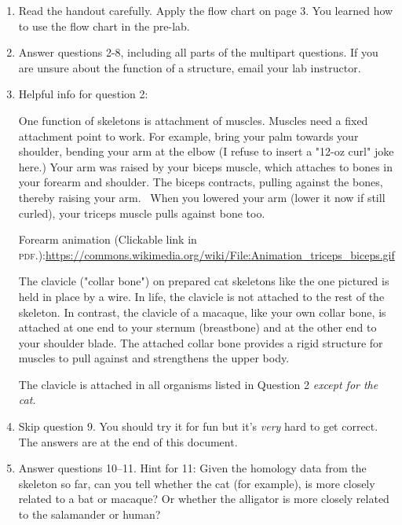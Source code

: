 \documentclass[12pt]{exam}
\begin{document}
\begin{enumerate}

\item Read the handout carefully. Apply the flow chart on page 3. You learned how to use the flow chart in the pre-lab.

\item Answer questions 2-8, including all parts of the multipart questions. If you are unsure about the function of a structure, email your lab instructor.

\item Helpful info for question 2:

One function of skeletons is attachment of muscles. Muscles need a fixed attachment point to work. For example, bring your palm towards your shoulder, bending your arm at the elbow (I refuse to insert a "12-oz curl" joke here.) Your arm was raised by your biceps muscle, which attaches to bones in your forearm and shoulder. The biceps contracts, pulling against the bones, thereby raising your arm.  When you lowered your arm (lower it now if still curled), your triceps muscle pulls against bone too. 

Forearm animation (Clickable link in \textsc{pdf}.):\newline \url{https://commons.wikimedia.org/wiki/File:Animation_triceps_biceps.gif} 

The clavicle ("collar bone") on prepared cat skeletons like the one pictured is held in place by a wire. In life, the clavicle is not attached to the rest of the skeleton. In contrast, the clavicle of a macaque, like your own collar bone, is attached at one end to your sternum (breastbone) and at the other end to your shoulder blade. The attached collar bone provides a rigid structure for muscles to pull against and strengthens the upper body. 

The clavicle is attached in all organisms listed in Question 2 \emph{except for the cat.}

\item Skip question 9. You should try it for fun but it's \emph{very} hard to get correct. The answers are at the end of this document.

\item Answer questions 10–11. Hint for 11: Given the homology data from the skeleton so far, can you tell whether the cat (for example), is more closely related to a bat or macaque? Or whether the alligator is more closely related to the salamander or human?

\end{enumerate}
\end{document}
